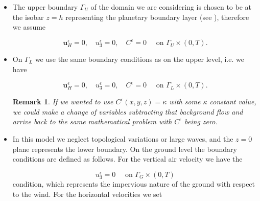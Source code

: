 \documentclass[11pt]{article}
\newtheorem{remark}{Remark}
\begin{document}
\begin{itemize}
  
  \item The upper boundary $\Gamma_U$ of the domain we are considering is chosen to be at the isobar $z=h$ representing the planetary boundary layer (see \cite{arya2001introduction}), therefore we assume
    
    \begin{equation}
      \mathbf{u}^\epsilon_H = 0, \quad u^\epsilon_3 = 0, \quad C^\epsilon = 0 \quad \text{ on } \Gamma_U \times (0,T).
    \end{equation}
      
  \item On $\Gamma_L$ we use the same boundary conditions as on the upper level, i.e. we have
    
    \begin{equation}
      \mathbf{u}^\epsilon_H = 0, \quad u^\epsilon_3 = 0, \quad C^\epsilon = 0  \quad \text{ on } \Gamma_L \times (0,T).
    \end{equation}
    
    \begin{remark}
    If we wanted to use $C^\epsilon(x,y,z) = \kappa$ with some $\kappa$ constant value, we could make a change of variables subtracting that background flow and arrive back to the same mathematical problem with $C^\epsilon$ being zero.
    \end{remark}
    
  \item In this model we neglect topological variations or large waves, and the $z=0$ plane represents the lower boundary. On the ground level the boundary conditions are defined as follows. For the vertical air velocity we have the
  
    \begin{equation}
      u^\epsilon_3 = 0 \quad \text{ on } \Gamma_G \times (0,T)
    \end{equation}
condition, which represents the impervious nature of the ground with respect to the wind. For the horizontal velocities we set


\end{itemize}
\end{document}
